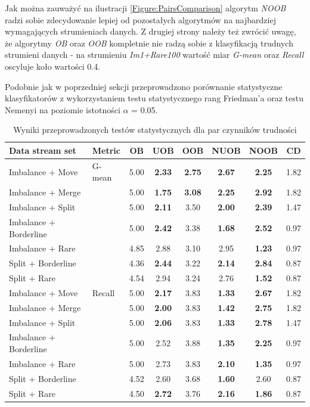 \noindent Jak można zauważyć na ilustracji \ref{Figure:PairsComparison} algorytm \textit{NOOB} radzi sobie zdecydowanie lepiej od pozostałych algorytmów na najbardziej wymagających strumieniach danych. Z drugiej strony należy też zwrócić uwagę, że algorytmy \textit{OB} oraz \textit{OOB} kompletnie nie radzą sobie z klasyfikacją trudnych strumieni danych - na strumieniu \textit{Im1+Rare100} wartość miar \textit{G-mean} oraz \textit{Recall} oscyluje koło wartości 0.4.

Podobnie jak w poprzedniej sekcji przeprowadzono porównanie statystyczne klasyfikatorów z wykorzystaniem testu statystycznego rang Friedman'a oraz testu Nemenyi na poziomie istotności $\alpha$ = 0.05.

\newpage

\begin{table}[ht]
\centering\small%
\setlength{\tabcolsep}{10pt} 
\renewcommand{\arraystretch}{1.5} 
\begin{tabular}{l l c c c c c c}
\toprule
Data stream set & Metric & OB & UOB & OOB & NUOB & NOOB & CD \\
\midrule
Imbalance + Move & G-mean & 5.00 & \textbf{2.33} & \textbf{2.75} & \textbf{2.67} & \textbf{2.25} & 1.82 \\
Imbalance + Merge  & & 5.00 & \textbf{1.75} & \textbf{3.08} & \textbf{2.25} & \textbf{2.92} & 1.82 \\
Imbalance + Split  & & 5.00 & \textbf{2.11} & 3.50 & \textbf{2.00} & \textbf{2.39} & 1.47 \\
Imbalance + Borderline  & & 5.00 & \textbf{2.42} & 3.38 & \textbf{1.68} & \textbf{2.52} & 0.97 \\
Imbalance + Rare  & & 4.85 & 2.88 & 3.10 & 2.95 & \textbf{1.23} & 0.97 \\
Split + Borderline  & & 4.36 & \textbf{2.44} & 3.22 & \textbf{2.14} & \textbf{2.84} & 0.87 \\
Split + Rare  & & 4.54 & 2.94 & 3.24 & 2.76 & \textbf{1.52} & 0.87 \\
Imbalance + Move & Recall & 5.00 & \textbf{2.17} & 3.83 & \textbf{1.33} & \textbf{2.67} & 1.82 \\
Imbalance + Merge  & & 5.00 & \textbf{2.00} & 3.83 & \textbf{1.42} & \textbf{2.75} & 1.82 \\
Imbalance + Split  & & 5.00 & \textbf{2.06} & 3.83 & \textbf{1.33} & \textbf{2.78} & 1.47 \\
Imbalance + Borderline  & & 5.00 & 2.52 & 3.88 & \textbf{1.35} & \textbf{2.25} & 0.97 \\
Imbalance + Rare  & & 5.00 & 2.73 & 3.83 & \textbf{2.10} & \textbf{1.35} & 0.97 \\
Split + Borderline  & & 4.52 & 2.60 & 3.68 & \textbf{1.60} & 2.60 & 0.87 \\
Split + Rare  & & 4.50 & \textbf{2.72} & 3.76 & \textbf{2.16} & \textbf{1.86} & 0.87 \\
\bottomrule
\end{tabular}
\caption{Wyniki przeprowadzonych testów statystycznych dla par czynników trudności}\label{Tab:DoubleDriftFriedman}
\end{table}

